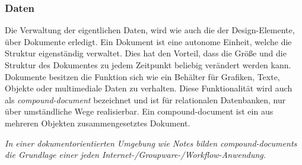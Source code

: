 
\subsubsection{Daten}
\label{sec:3dominoDB}

Die Verwaltung der eigentlichen Daten, wird wie auch die der Design-Elemente, über Dokumente erledigt. 
Ein Dokument ist eine autonome Einheit, welche die Struktur eigenständig verwaltet. Dies hat den Vorteil, dass die Größe und die Struktur des 
Dokumentes zu jedem Zeitpunkt beliebig verändert werden kann. Dokumente besitzen die Funktion sich wie ein Behälter für Grafiken, Texte, Objekte
oder multimediale Daten zu verhalten. Diese Funktionalität wird auch als \textit{compound-document} bezeichnet und ist für relationalen Datenbanken,
nur über umständliche Wege realisierbar. Ein compound-document ist ein aus mehreren Objekten zusammengesetztes Dokument\cite{wind}. 

\vspace{0.5cm}

\begin{graybox}
\textit{In einer dokumentorientierten Umgebung wie Notes bilden compound-documents die Grundlage einer jeden Internet-/Groupware-/Workflow-Anwendung\cite{knaepper}.}
\end{graybox}






